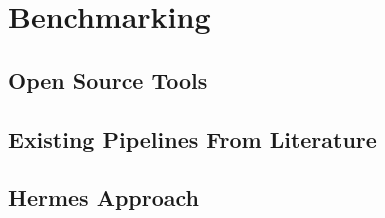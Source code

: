 \chapter{Benchmarking}
\label{ch:benchmarking}


\section{Open Source Tools}

\section{Existing Pipelines From Literature}

\section{Hermes Approach}

